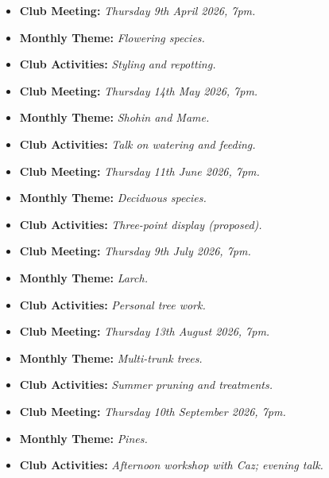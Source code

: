 \begin{itemize}
    \item \textbf{Club Meeting:} \textit{Thursday 9th April 2026, 7pm.}
    \item \textbf{Monthly Theme:} \textit{Flowering species.}
    \item \textbf{Club Activities:} \textit{Styling and repotting.}
\end{itemize}

\begin{itemize}
    \item \textbf{Club Meeting:} \textit{Thursday 14th May 2026, 7pm.}
    \item \textbf{Monthly Theme:} \textit{Shohin and Mame.}
    \item \textbf{Club Activities:} \textit{Talk on watering and feeding.}
\end{itemize}

\begin{itemize}
    \item \textbf{Club Meeting:} \textit{Thursday 11th June 2026, 7pm.}
    \item \textbf{Monthly Theme:} \textit{Deciduous species.}
    \item \textbf{Club Activities:} \textit{Three\--point display (proposed).}
\end{itemize}

\begin{itemize}
    \item \textbf{Club Meeting:} \textit{Thursday 9th July 2026, 7pm.}
    \item \textbf{Monthly Theme:} \textit{Larch.}
    \item \textbf{Club Activities:} \textit{Personal tree work.}
\end{itemize}

\begin{itemize}
    \item \textbf{Club Meeting:} \textit{Thursday 13th August 2026, 7pm.}
    \item \textbf{Monthly Theme:} \textit{Multi\--trunk trees.}
    \item \textbf{Club Activities:} \textit{Summer pruning and treatments.}
\end{itemize}

\begin{itemize}
    \item \textbf{Club Meeting:} \textit{Thursday 10th September 2026, 7pm.}
    \item \textbf{Monthly Theme:} \textit{Pines.}
    \item \textbf{Club Activities:} \textit{Afternoon workshop with Caz; evening talk.}
\end{itemize}

